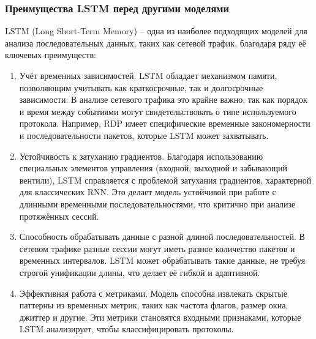 \documentclass[bachelor, och, coursework]{SCWorks}
\begin{document}
\subsubsection{Преимущества LSTM перед другими моделями}

  LSTM (Long Short-Term Memory) -- одна из наиболее подходящих моделей для анализа последовательных данных, таких как 
  сетевой трафик, благодаря ряду её ключевых преимуществ: 

  \begin{enumerate}
    \item Учёт временных зависимостей. LSTM обладает механизмом памяти, позволяющим учитывать как краткосрочные, так и 
    долгосрочные зависимости. В анализе сетевого трафика это крайне важно, так как порядок и время между событиями могут 
    свидетельствовать о типе используемого протокола. Например, RDP имеет специфические временные закономерности и последовательности пакетов, 
    которые LSTM может захватывать.  

    \item Устойчивость к затуханию градиентов. Благодаря использованию специальных элементов управления (входной, выходной и забывающий вентили), 
    LSTM справляется с проблемой затухания градиентов, характерной для классических RNN. Это делает модель устойчивой при работе с длинными 
    временными последовательностями, что критично при анализе протяжённых сессий.  

    \item Способность обрабатывать данные с разной длиной последовательностей. В сетевом трафике разные сессии могут иметь разное количество
    пакетов и временных интервалов. LSTM может обрабатывать такие данные, не требуя строгой унификации длины, что делает её гибкой и адаптивной.  

    \item Эффективная работа с метриками. Модель способна извлекать скрытые паттерны из временных метрик, таких как частота флагов, 
    размер окна, джиттер и другие. Эти метрики становятся входными признаками, которые LSTM анализирует, чтобы классифицировать протоколы.  

  \end{enumerate}


\end{document}
